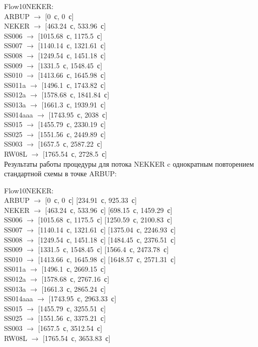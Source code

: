 \documentclass[12pt]{article}
\theoremstyle{plain}
\begin{document}
\noindent Flow10NEKER:\\
ARBUP $\rightarrow$ [0~с, 0~с]\\
NEKER $\rightarrow$ [463.24~с, 533.96~с]\\
SS006 $\rightarrow$ [1015.68~с, 1175.5~с]\\
SS007 $\rightarrow$ [1140.14~с, 1321.61~с]\\
SS008 $\rightarrow$ [1249.54~с, 1451.18~с]\\
SS009 $\rightarrow$ [1331.5~с, 1548.45~с]\\
SS010 $\rightarrow$ [1413.66~с, 1645.98~с]\\
SS011a $\rightarrow$ [1496.1~с, 1743.82~с]\\
SS012a $\rightarrow$ [1578.68~с, 1841.84~с]\\
SS013a $\rightarrow$ [1661.3~с, 1939.91~с]\\
SS014aaa $\rightarrow$ [1743.95~с, 2038~с]\\
SS015 $\rightarrow$ [1455.79~с, 2330.19~с]\\
SS025 $\rightarrow$ [1551.56~с, 2449.89~с]\\
SS003 $\rightarrow$ [1657.5~с, 2587.22~с]\\
RW08L $\rightarrow$ [1765.54~с, 2728.5~с]\\



Результаты работы процедуры для потока NEKKER c однократным повторением стандартной схемы в точке ARBUP:

\noindent Flow10NEKER:\\
ARBUP $\rightarrow$ [0~с, 0~с] [234.91~с, 925.33~с]\\
NEKER $\rightarrow$ [463.24~с, 533.96~с] [698.15~с, 1459.29~с]\\
SS006 $\rightarrow$ [1015.68~с, 1175.5~с] [1250.59~с, 2100.83~с]\\
SS007 $\rightarrow$ [1140.14~с, 1321.61~с] [1375.04~с, 2246.93~с]\\
SS008 $\rightarrow$ [1249.54~с, 1451.18~с] [1484.45~с, 2376.51~с]\\
SS009 $\rightarrow$ [1331.5~с, 1548.45~с] [1566.4~с, 2473.78~с]\\
SS010 $\rightarrow$ [1413.66~с, 1645.98~с] [1648.57~с, 2571.31~с]\\
SS011a $\rightarrow$ [1496.1~с, 2669.15~с]\\
SS012a $\rightarrow$ [1578.68~с, 2767.16~с]\\
SS013a $\rightarrow$ [1661.3~с, 2865.24~с]\\
SS014aaa $\rightarrow$ [1743.95~с, 2963.33~с]\\
SS015 $\rightarrow$ [1455.79~с, 3255.51~с]\\
SS025 $\rightarrow$ [1551.56~с, 3375.21~с]\\
SS003 $\rightarrow$ [1657.5~с, 3512.54~с]\\
RW08L $\rightarrow$ [1765.54~с, 3653.83~с]\\
\end{document}
